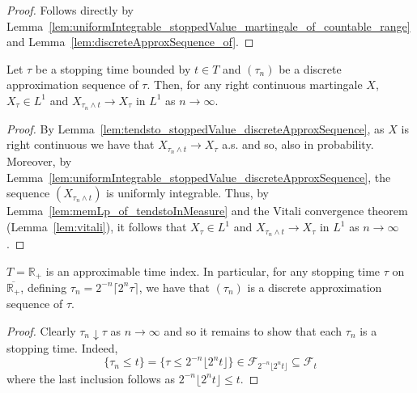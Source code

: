 \begin{proof}
  \leanok
  Follows directly by Lemma~\ref{lem:uniformIntegrable_stoppedValue_martingale_of_countable_range} and Lemma~\ref{lem:discreteApproxSequence_of}.
\end{proof}

\begin{lemma}\label{lem:tendsto_eLpNorm_stoppedValue_discreteApproxSequence}
  \leanok
  Let \(\tau\) be a stopping time bounded by \(t \in T\) and \((\tau_n)\) be a discrete approximation sequence of \(\tau\).
  Then, for any right continuous martingale \(X\), \(X_{\tau} \in L^1\) and \(X_{\tau_n \wedge t} \to X_{\tau}\) in \(L^1\) as \(n \to \infty\).
\end{lemma}

\begin{proof}
  \leanok
  By Lemma~\ref{lem:tendsto_stoppedValue_discreteApproxSequence}, as \(X\) is right continuous we have that \(X_{\tau_n \wedge t} \to X_{\tau}\) a.s. and so,
  also in probability. Moreover, by Lemma~\ref{lem:uniformIntegrable_stoppedValue_discreteApproxSequence}, the sequence \((X_{\tau_n \wedge t})\) is uniformly integrable.
  Thus, by Lemma~\ref{lem:memLp_of_tendstoInMeasure} and the Vitali convergence theorem (Lemma~\ref{lem:vitali}), it
  follows that \(X_{\tau} \in L^1\) and \(X_{\tau_n \wedge t} \to X_{\tau}\) in \(L^1\) as \(n \to \infty\).
\end{proof}

\begin{lemma}\label{lem:stoppingTime_approximation}
  \leanok
  $T = \mathbb{R}_+$ is an approximable time index. In particular,
  for any stopping time $\tau$ on $\overline{\mathbb{R}_+}$, defining $\tau_n =  2^{-n} \lceil 2^n \tau \rceil$,
  we have that $(\tau_n)$ is a discrete approximation sequence of $\tau$.
\end{lemma}

\begin{proof}
  Clearly $\tau_n \downarrow \tau$ as $n \to \infty$ and so it remains to show that each $\tau_n$ is a stopping time.
  Indeed,
  \[\{\tau_n \le t\} = \{\tau \le 2^{-n} \lfloor 2^n t\rfloor\}
    \in \mathcal{F}_{2^{-n} \lfloor 2^n t\rfloor} \subseteq \mathcal{F}_t\]
  where the last inclusion follows as \(2^{-n} \lfloor 2^n t\rfloor \le t\).
\end{proof}

